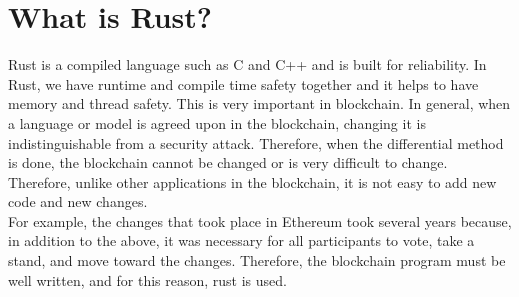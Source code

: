 \section{What is Rust?}
Rust is a compiled language such as C and C++ and is built for reliability. In Rust, we have runtime and compile time safety together and it helps to have memory and thread safety. This is very important in blockchain. In general, when a language or model is agreed upon in the blockchain, changing it is indistinguishable from a security attack. Therefore, when the differential method is done, the blockchain cannot be changed or is very difficult to change. Therefore, unlike other applications in the blockchain, it is not easy to add new code and new changes.\\ For example, the changes that took place in Ethereum took several years because, in addition to the above, it was necessary for all participants to vote, take a stand, and move toward the changes. Therefore, the blockchain program must be well written, and for this reason, rust is used.
